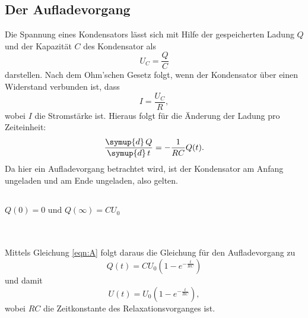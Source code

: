 \subsection{Der Aufladevorgang}
    Die Spannung eines Kondensators lässt sich mit Hilfe der gespeicherten Ladung $Q$ und der Kapazität $C$ des Kondensator als 
    \begin{equation}
        \label{eqn:UC}
        U_C = \frac{Q}{C}
    \end{equation}
    darstellen. Nach dem Ohm'schen Gesetz folgt, wenn der Kondensator über einen Widerstand verbunden ist, dass
    \begin{equation}
        \label{eqn:strom}
        I = \frac{U_C}{R},
    \end{equation}
    wobei $I$ die Stromstärke ist. Hieraus folgt für die Änderung der Ladung pro Zeiteinheit:
    \begin{equation}
        \label{eqn:ladung}
        \frac{\symup{d} \, Q}{\symup{d} \, t} = - \frac{1}{RC} Q(t).
    \end{equation}
    Da hier ein Aufladevorgang betrachtet wird, ist der Kondensator am Anfang ungeladen und am Ende ungeladen, also gelten.
    \\ \\
    \centerline{$Q(0) = 0 \text{ und } Q(\infty)  = C U_0$}
    \\ \\
    Mittels Gleichung \eqref{eqn:A} folgt daraus die Gleichung für den Aufladevorgang zu
    \begin{equation}
        \label{eqn:aufladung}
        Q(t) = C U_0 (1 - e^{-\frac{t}{RC}} )
    \end{equation}
    und damit
    \begin{equation}
        \label{eqn:wunschformel}
        U(t) = U_0 (1 - e^{-\frac{t}{RC}} ),
    \end{equation}    
    wobei $RC$ die Zeitkonstante des Relaxationsvorganges ist.    
 

